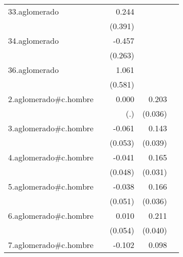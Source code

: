 {\begin{longtable}{l*{4}{D{.}{.}{-1}}}
\addlinespace
33.aglomerado&                     &       0.244         &                     &                     \\
            &                     &     (0.391)         &                     &                     \\
\addlinespace
34.aglomerado&                     &      -0.457         &                     &                     \\
            &                     &     (0.263)         &                     &                     \\
\addlinespace
36.aglomerado&                     &       1.061         &                     &                     \\
            &                     &     (0.581)         &                     &                     \\
\addlinespace
2.aglomerado#c.hombre&                     &       0.000         &       0.203\sym{***}&                     \\
            &                     &         (.)         &     (0.036)         &                     \\
\addlinespace
3.aglomerado#c.hombre&                     &      -0.061         &       0.143\sym{***}&                     \\
            &                     &     (0.053)         &     (0.039)         &                     \\
\addlinespace
4.aglomerado#c.hombre&                     &      -0.041         &       0.165\sym{***}&                     \\
            &                     &     (0.048)         &     (0.031)         &                     \\
\addlinespace
5.aglomerado#c.hombre&                     &      -0.038         &       0.166\sym{***}&                     \\
            &                     &     (0.051)         &     (0.036)         &                     \\
\addlinespace
6.aglomerado#c.hombre&                     &       0.010         &       0.211\sym{***}&                     \\
            &                     &     (0.054)         &     (0.040)         &                     \\
\addlinespace
7.aglomerado#c.hombre&                     &      -0.102         &       0.098\sym{*}  &                     \\

\end{longtable}}
